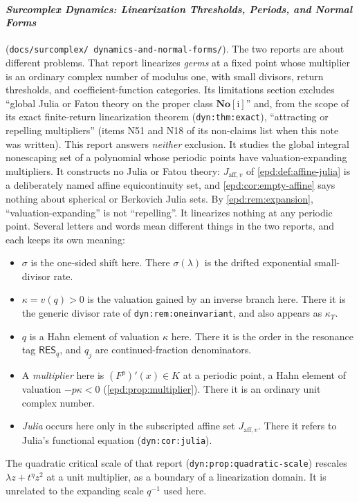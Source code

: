 \documentclass[11pt,a4paper]{article}
\numberwithin{equation}{section}
\theoremstyle{plain}
\theoremstyle{definition}
\theoremstyle{remark}
\newcommand{\No}{\mathbf{No}}
\begin{document}
\paragraph{\emph{Surcomplex Dynamics: Linearization Thresholds, Periods,
and Normal Forms}} (\texttt{docs/\allowbreak surcomplex/\allowbreak
dynamics-and-\allowbreak normal-forms/}). The two reports are about different
problems. That report linearizes \emph{germs} at a fixed point whose
multiplier is an ordinary complex number of modulus one, with small
divisors, return thresholds, and coefficient-function categories. Its
limitations section excludes ``global Julia or Fatou theory on the proper
class $\No[\mathrm i]$'' and, from the scope of its exact finite-return
linearization theorem (\texttt{dyn:thm:exact}), ``attracting or repelling
multipliers'' (items N51 and N18 of its non-claims list when this note was
written). This
report answers \emph{neither} exclusion. It studies the global integral
nonescaping set of a polynomial whose periodic points have
valuation-expanding multipliers. It constructs no Julia or Fatou theory:
$J_{\mathrm{aff},v}$ of \cref{epd:def:affine-julia} is a deliberately
named affine equicontinuity set, and \cref{epd:cor:empty-affine} says
nothing about spherical or Berkovich Julia sets. By \cref{epd:rem:expansion},
``valuation-expanding'' is not ``repelling''. It linearizes nothing at any
periodic point. Several letters and words mean different things in the
two reports, and each keeps its own meaning:
\begin{itemize}[leftmargin=1.4em]
\item $\sigma$ is the one-sided shift here. There $\sigma(\lambda)$ is the
drifted exponential small-divisor rate.
\item $\kappa=v(q)>0$ is the valuation gained by an inverse branch here.
There it is the generic divisor rate of \texttt{dyn:rem:oneinvariant}, and
also appears as $\kappa_\Upsilon$.
\item $q$ is a Hahn element of valuation $\kappa$ here. There it is the order
in the resonance tag $\mathsf{RES}_q$, and $q_j$ are continued-fraction
denominators.
\item A \emph{multiplier} here is $(F^p)'(x)\in K$ at a periodic point, a Hahn
element of valuation $-p\kappa<0$ (\cref{epd:prop:multiplier}). There
it is an ordinary unit complex number.
\item \emph{Julia} occurs here only in the subscripted affine set
$J_{\mathrm{aff},v}$. There it refers to Julia's functional equation
(\texttt{dyn:cor:julia}).
\end{itemize}
The quadratic critical scale of that report
(\texttt{dyn:prop:quadratic-scale}) rescales $\lambda z+t^\eta z^2$ at a
unit multiplier, as a boundary of a linearization domain. It is unrelated
to the expanding scale $q^{-1}$ used here.
\end{document}
